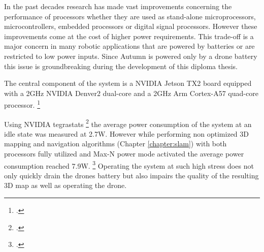 In the past decades research has made vast improvements concerning the performance of processors whether they are used as stand-alone microprocessors, microcontrollers, embedded processors or digital signal processors. However these improvements come at the cost of higher power requirements. This trade-off is a major concern in many robotic applications that are powered by batteries or are restricted to low power inputs. Since Autumn is powered only by a drone battery this issue is groundbreaking during the development of this diploma thesis. 

The central component of the system is a NVIDIA Jetson TX2 board equipped with a 2GHz NVIDIA Denver2 dual-core and a 2GHz Arm Cortex-A57 quad-core processor. \footcite{jetsonHardwarePageNoDate}

Using NVIDIA tegrastats \footcite{nvidiaTegrastatsNoDate} the average power consumption of the system at an idle state was measured at 2.7W. However while performing non optimized 3D mapping and navigation algorithms (Chapter \ref{chapter:slam}) with both processors fully utilized and Max-N power mode activated the average power consumption reached 7.9W. \footcite{jetsonPowerModesNoDate} 
Operating the system at such high stress does not only quickly drain the drones battery but also impairs the quality of the resulting 3D map as well as operating the drone.


